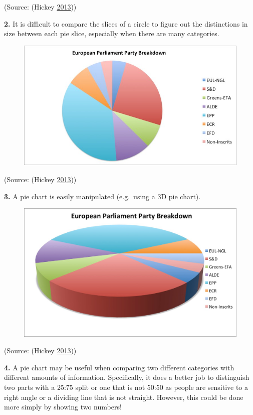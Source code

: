 \documentclass[]{book}
\theoremstyle{definition}
\theoremstyle{definition}
\theoremstyle{definition}
\theoremstyle{remark}
\begin{document}
(Source: (Hickey \protect\hyperlink{ref-hickey-pie-worst}{2013}))

\textbf{2.} It is difficult to compare the slices of a circle to figure
out the distinctions in size between each pie slice, especially when
there are many categories.

\begin{figure}
\centering
\includegraphics{images/hickey-breakdown.jpg}
\caption{}
\end{figure}

(Source: (Hickey \protect\hyperlink{ref-hickey-pie-worst}{2013}))

\textbf{3.} A pie chart is easily manipulated (e.g.~using a 3D pie
chart).

\begin{figure}
\centering
\includegraphics{images/hickey-3D.jpg}
\caption{}
\end{figure}

(Source: (Hickey \protect\hyperlink{ref-hickey-pie-worst}{2013}))

\textbf{4.} A pie chart may be useful when comparing two different
categories with different amounts of information. Specifically, it does
a better job to distinguish two parts with a 25:75 split or one that is
not 50:50 as people are sensitive to a right angle or a dividing line
that is not straight. However, this could be done more simply by showing
two numbers!
\end{document}
